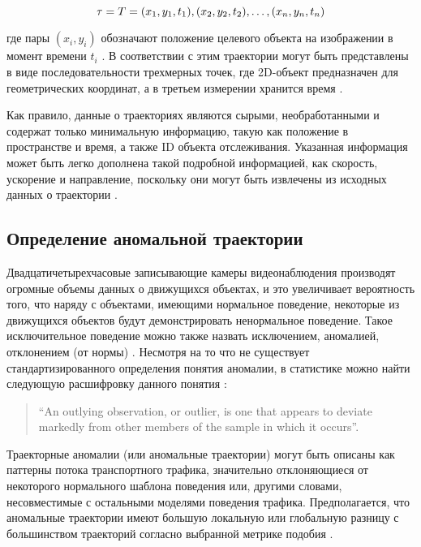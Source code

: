 \begin{equation}
	\tau = T = {(x_1, y_1, t_1), (x_2, y_2, t_2), \ldots, (x_n, y_n, t_n)}\\[3pt]
\end{equation}

где пары $(x_i,y_i)$ обозначают положение целевого объекта на изображении в момент времени $t_i$ \cite{article:5_survey_tbsa}. В соответствии с этим траектории могут быть представлены в виде последовательности трехмерных точек, где 2D-объект предназначен для геометрических координат, а в третьем измерении хранится время \cite{article:25_dhr_mvt_eesd}.

Как правило, данные о траекториях являются сырыми, необработанными и содержат только минимальную информацию, такую как положение в пространстве и время, а также ID объекта отслеживания. Указанная информация может быть легко дополнена такой подробной информацией, как скорость, ускорение и направление, поскольку они могут быть извлечены из исходных данных о траектории \cite{article:12_dssto_mot}.

\subsection{Определение аномальной траектории}

Двадцатичетырехчасовые записывающие камеры видеонаблюдения производят огромные объемы данных о движущихся объектах, и это увеличивает вероятность того, что наряду с объектами, имеющими нормальное поведение, некоторые из движущихся объектов будут демонстрировать ненормальное поведение. Такое исключительное поведение можно также назвать исключением, аномалией, отклонением (от нормы) \cite{article:11_eod_hdd}\cite{article:15_survey_ad}. Несмотря на то что не существует стандартизированного определения понятия аномалии, в статистике можно найти следующую расшифровку данного понятия \cite{article:13_pdoos}:

\begin{quote}
	``An outlying observation, or outlier, is one that appears to deviate markedly from other members of the sample in which it occurs''.
\end{quote}

Траекторные аномалии (или аномальные траектории) могут быть описаны как паттерны потока транспортного трафика, значительно отклоняющиеся от некоторого нормального шаблона поведения или, другими словами, несовместимые с остальными моделями поведения трафика. Предполагается, что аномальные траектории имеют большую локальную или глобальную разницу с большинством траекторий согласно выбранной метрике подобия \cite{article:over_tod}.

